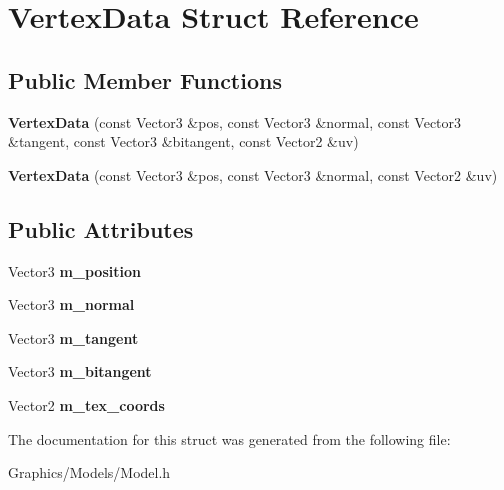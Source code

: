 \hypertarget{structVertexData}{}\section{Vertex\+Data Struct Reference}
\label{structVertexData}
\subsection*{Public Member Functions}
\begin{DoxyCompactItemize}
\item 
\mbox{\label{structVertexData_abf3e41eb31cd7fdf38007d5b48d01ceb}} 
{\bfseries Vertex\+Data} (const Vector3 \&pos, const Vector3 \&normal, const Vector3 \&tangent, const Vector3 \&bitangent, const Vector2 \&uv)
\item 
\mbox{\label{structVertexData_a68e6e2d81fba7f341e07cf745ed52a1c}} 
{\bfseries Vertex\+Data} (const Vector3 \&pos, const Vector3 \&normal, const Vector2 \&uv)
\end{DoxyCompactItemize}
\subsection*{Public Attributes}
\begin{DoxyCompactItemize}
\item 
\mbox{\label{structVertexData_a1a663ce58f40113256072fcf56eb9275}} 
Vector3 {\bfseries m\+\_\+position}
\item 
\mbox{\label{structVertexData_ab02659723f5bbcede17e149b350e1017}} 
Vector3 {\bfseries m\+\_\+normal}
\item 
\mbox{\label{structVertexData_a4b4e81dd8575c585ffedd5d1ab101e8f}} 
Vector3 {\bfseries m\+\_\+tangent}
\item 
\mbox{\label{structVertexData_a33c0e5127a8ef25613588f66e8dce5fb}} 
Vector3 {\bfseries m\+\_\+bitangent}
\item 
\mbox{\label{structVertexData_ac25d55e9fffa733f8c11363ec17520ee}} 
Vector2 {\bfseries m\+\_\+tex\+\_\+coords}
\end{DoxyCompactItemize}


The documentation for this struct was generated from the following file\+:\begin{DoxyCompactItemize}
\item 
Graphics/\+Models/Model.\+h\end{DoxyCompactItemize}
